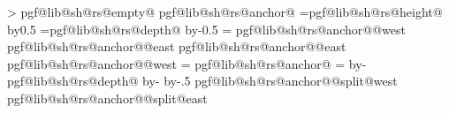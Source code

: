 {{            %
            \pgfextract@process{}%
            \addtosavedmacro\centerpoint%
            \pgfmathloop%
                \ifnum\pgfmathcounter>\parts%
                \else%
                    \pgf@lib@sh@getalpha\pgf@lib@sh@rs@number{\pgfmathcounter}%
                    \expandafter\ifx\csname pgf@lib@sh@rs@empty@\pgf@lib@sh@rs@number\endcsname\pgfutil@empty%
                    \else%
                        \csname pgf@lib@sh@rs@anchor@\pgf@lib@sh@rs@number\endcsname%
                        \pgf@ya=\csname pgf@lib@sh@rs@height@\pgf@lib@sh@rs@number\endcsname\relax%
                        \advance\pgf@y by0.5\pgf@ya%
                        \pgf@ya=\csname pgf@lib@sh@rs@depth@\pgf@lib@sh@rs@number\endcsname\relax%
                        \advance\pgf@y by-0.5\pgf@ya%
                        \pgf@ya=\pgf@y%
                        \expandafter\pgfextract@process\csname pgf@lib@sh@rs@anchor@\pgf@lib@sh@rs@number @west\endcsname{%
                            \southwest%
                            \pgf@y=\pgf@ya%
                        }%
                        \expandafter\pgfextract@process\csname pgf@lib@sh@rs@anchor@\pgf@lib@sh@rs@number @east\endcsname{%
                            \northeast%
                            \pgf@y=\pgf@ya%
                        }%
                        \expandafter\addtosavedmacro\csname pgf@lib@sh@rs@anchor@\pgf@lib@sh@rs@number @east\endcsname%
                        \expandafter\addtosavedmacro\csname pgf@lib@sh@rs@anchor@\pgf@lib@sh@rs@number @west\endcsname%
                        \ifnum\pgfmathcounter=\parts%
                        \else%
                            \csname pgf@lib@sh@rs@anchor@\pgf@lib@sh@rs@number\endcsname%
                            \pgf@ya=\pgf@y%
                            \advance\pgf@ya by-\csname pgf@lib@sh@rs@depth@\pgf@lib@sh@rs@number\endcsname\relax%
                            \advance\pgf@ya by-\innerysep\relax%
                            \advance\pgf@ya by-.5\pgflinewidth%
                            \expandafter\pgfextract@process\csname pgf@lib@sh@rs@anchor@\pgf@lib@sh@rs@number @split@west\endcsname{%
                                \southwest%
                                \pgf@y=\pgf@ya%
                            }%
                            \expandafter\pgfextract@process\csname pgf@lib@sh@rs@anchor@\pgf@lib@sh@rs@number @split@east\endcsname{%
                                \northeast%
}}}

